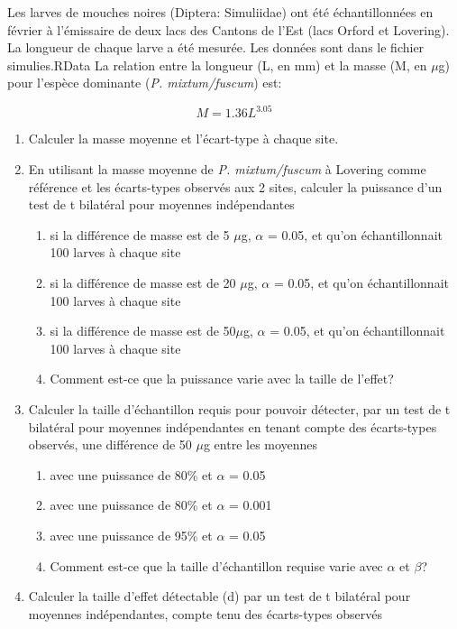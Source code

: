 \documentclass[12pt,]{book}
\makeatletter
\providecommand{\tightlist}{%
  \setlength{\itemsep}{0pt}\setlength{\parskip}{0pt}}
\newenvironment{kframe}{%
\medskip{}
\setlength{\fboxsep}{.8em}
 \def\at@end@of@kframe{}%
 \ifinner\ifhmode%
  \def\at@end@of@kframe{\end{minipage}}%
  \begin{minipage}{\columnwidth}%
 \fi\fi%
 \def\FrameCommand##1{\hskip\@totalleftmargin \hskip-\fboxsep
 \colorbox{shadecolor}{##1}\hskip-\fboxsep
     \hskip-\linewidth \hskip-\@totalleftmargin \hskip\columnwidth}%
 \MakeFramed {\advance\hsize-\width
   \@totalleftmargin\z@ \linewidth\hsize
   \@setminipage}}%
 {\par\unskip\endMakeFramed%
 \at@end@of@kframe}
\newenvironment{rmdblock}[1]
  {
  \begin{itemize}
  \renewcommand{\labelitemi}{
    \raisebox{-.7\height}[0pt][0pt]{
      {\setkeys{Gin}{width=3em,keepaspectratio}\texttt{[image: images/\#1]}}
    }
  }
  \setlength{\fboxsep}{1em}
  \begin{kframe}
  \item
  }
  {
  \end{kframe}
  \end{itemize}
  }
\newenvironment{rmdcode}
  {\begin{rmdblock}{screen}}
  {\end{rmdblock}}
\makeatother
\begin{document}
\begin{rmdcode}
Les larves de mouches noires (Diptera: Simuliidae) ont été échantillonnées en février à l'émissaire de deux lacs des Cantons de l'Est (lacs Orford et Lovering).
La longueur de chaque larve a été mesurée.
Les données sont dans le fichier simulies.RData La relation entre la longueur (L, en mm) et la masse (M, en \(\mu\)g) pour l'espèce dominante (\emph{P. mixtum/fuscum}) est:

\[
M = 1.36 L^3.05
\]

\begin{enumerate}
\def\labelenumi{\arabic{enumi}.}
\tightlist
\item
  Calculer la masse moyenne et l'écart-type à chaque site.
\item
  En utilisant la masse moyenne de \emph{P. mixtum/fuscum} à Lovering comme référence et les écarts-types observés aux 2 sites, calculer la puissance d'un test de t bilatéral pour moyennes indépendantes

  \begin{enumerate}
  \def\labelenumii{\alph{enumii})}
  \tightlist
  \item
    si la différence de masse est de 5 \(\mu\)g, \(\alpha\) = 0.05, et qu'on échantillonnait 100 larves à chaque site
  \item
    si la différence de masse est de 20 \(\mu\)g, \(\alpha\) = 0.05, et qu'on échantillonnait 100 larves à chaque site
  \item
    si la différence de masse est de 50\(\mu\)g, \(\alpha\) = 0.05, et qu'on échantillonnait 100 larves à chaque site
  \item
    Comment est-ce que la puissance varie avec la taille de l'effet?
  \end{enumerate}
\item
  Calculer la taille d'échantillon requis pour pouvoir détecter, par un test de t bilatéral pour moyennes indépendantes en tenant compte des écarts-types observés, une différence de 50 \(\mu\)g entre les moyennes

  \begin{enumerate}
  \def\labelenumii{\alph{enumii})}
  \tightlist
  \item
    avec une puissance de 80\% et \(\alpha\) = 0.05
  \item
    avec une puissance de 80\% et \(\alpha\) = 0.001
  \item
    avec une puissance de 95\% et \(\alpha\) = 0.05
  \item
    Comment est-ce que la taille d'échantillon requise varie avec \(\alpha\) et \(\beta\)?
  \end{enumerate}
\item
  Calculer la taille d'effet détectable (d) par un test de t bilatéral pour moyennes indépendantes, compte tenu des écarts-types observés


\end{enumerate}
\end{rmdcode}
\end{document}
